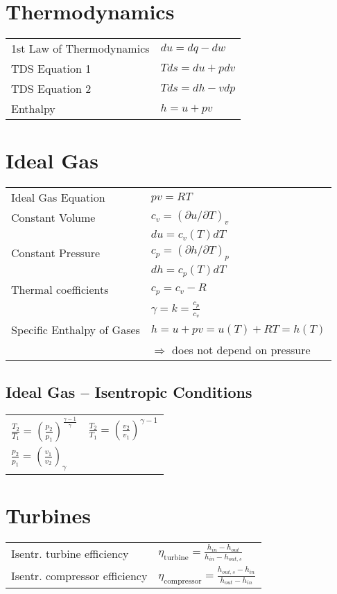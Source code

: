 




\section*{Thermodynamics}
\begin{tabular}{ m{5cm} l}
    1st Law of Thermodynamics & $du = dq - dw$  \\
    TDS Equation 1 & $Tds = du + pdv$ \\
    TDS Equation 2 & $Tds = dh - vdp$ \\
    Enthalpy & $h = u + pv$
\end{tabular}

\section*{Ideal Gas}
\begin{tabular}{ m{5cm} l}
    Ideal Gas Equation & $pv = RT$ \\
    Constant Volume & $c_v = (\partial u / \partial T)_v$ \\
     & $du = c_v (T) dT$ \\
     Constant Pressure & $c_p = (\partial h / \partial T)_p$ \\
     & $dh = c_p (T) dT$ \\
     Thermal coefficients & $c_p = c_v - R$ \\
      & $\gamma = k = \frac{c_p}{c_v}$ \\
      Specific Enthalpy of Gases & $h = u + pv = u(T) + RT = h(T)$ \\
       & $\Rightarrow$ does not depend on pressure
\end{tabular}

\subsection*{Ideal Gas – Isentropic Conditions}
\begin{tabular}{ m{5cm} l}
    $\frac{T_2}{T_1} = \left( \frac{p_2}{p_1} \right)^{ \frac{\gamma - 1}{\gamma}} $ & $\frac{T_2}{T_1} = \left( \frac{v_2}{v_1} \right)^{ \gamma -1 } $ \\
    $\frac{p_2}{p_1} = \left( \frac{v_1}{v_2} \right)_{ \gamma } $ & \\
\end{tabular}

\section*{Turbines}
    \begin{tabular}{ m{5cm} l}
    Isentr. turbine efficiency & $\eta_{\text{turbine}} = \frac{h_{in} - h_{out}}{h_{in} - h_{out,s}}$ \\
    Isentr. compressor efficiency & $\eta_{\text{compressor}} = \frac{h_{out,s} - h_{in}}{h_{out} - h_{in}}$ \\
    \end{tabular}


